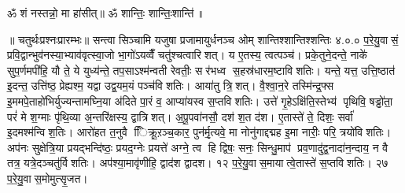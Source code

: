 ॐ शं नस्तन्नो॒ मा हा॑सीत्॥ ॐ शान्तिः॒ शान्तिः॒शान्ति॑॥



\setcounter{anuvakam}{0}
॥ चतुर्थःप्रश्नःप्रारम्भः॥ सन्त्वा सिञ्चामि यजुषा प्रजामायुर्धनञ्च ओम् शान्तिश्शान्तिश्शन्तिः
४.०.०
प॒रे॒यु॒वासं॒ प्रवि॒द्वान्भुव॑नस्या॒भ्याव॑वृत्स्वा॒जो भा॒गो॑ऽयव्वैँ चतु॑श्चत्वारिशत्। य ए॒तस्य॒ त्वत्पञ्च॑। प्रके॒तुने॒दन्ते॒ नाके॑ सुप॒र्णमपी॑हि॒ यौ ते॒ ये युध्य॑न्ते॒ तप॒साऽश्म॑न्वती रेवतीः॒ सर॑भध्व स॒हस्र॑धारम॒ष्टाविशतिः। यन्ते॒ यत्त॒ उत्ति॒ष्ठात॑ इ॒दन्त॒ उत्ति॑ष्ठ॒ प्रेह्यश्म॒\an{} यद्वा उद्व॒यम॒यं पञ्च॑विशतिः। आया॑तु त्रि॒शत्। वै॒श्वा॒न॒रे तस्मि॑न्द्र॒फ्स इ॒ममपे॒ताहो॑भिर्युज्यन्तामघ्नि॒या अ॑दिते पा॒रं व॒ आप्या॑यस्व स॒प्तविशतिः। उत्ते॑ गृ॒हेऽक्षि॑ति॒स्तेभ्य॑ पृथिवि॒ षड्ढो॑ता॒ परं॑ मे श॒ग्माः पृ॑थि॒व्या अ॒न्तरि॑क्षस्य॒ द्वात्रिशत्। अ॒पू॒पवा॑नसौ॒ दश॑ श॒त द॑श। ए॒तास्ते॑ ते॒ दिशः॒ सर्वा॑ इ॒दमश्म॑न्विश॒तिः। आरो॑हत त॒नुवै ििक्रू॒ऱञ्च॒कार॒ पुन॑र्मृ॒त्यवे॒ मा नोनु॑गाद्दद्मह इ॒मा नारीः॒ परि॒ त्रयो॑विशतिः। अप॑नः सुक्षेत्रि॒या प्रयद्भन्दि॑ष्ठः॒ प्रयद॒ग्नेः प्रयत्ते॑ अग्ने॒ त्व हि द्विषः॒ सनः॒ सिन्धु॒माप॑ प्रव॒णादु॑द्व॒नादा॑न॒न्दाय॒ न वै तत्र॒ यत्रे॒दञ्चतु॑र्विशतिः। अप॑श्या॒मावृ॑णीहि॒ द्वाद॑श द्वादश। १२ प॒रे॒यु॒वास॒मायात्वे॒तास्ते॑ स॒प्तविशतिः। २७ प॒रे॒यु॒वास॒मोमुत्सृ॒जत।
\anuvakamend

